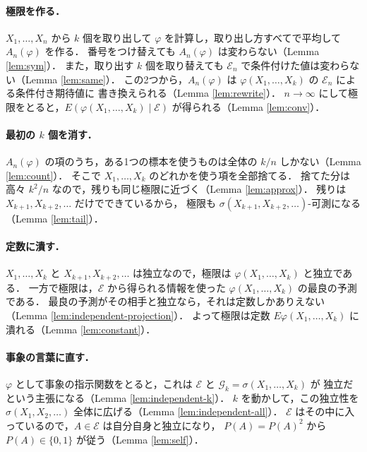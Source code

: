 \documentclass[a4paper,11pt,uplatex,dvipdfmx]{jsarticle}
\theoremstyle{plain}
\theoremstyle{definition}
\begin{document}
\paragraph{極限を作る．}
$X_1,\dots,X_n$ から $k$ 個を取り出して $\varphi$ を計算し，取り出し方すべてで平均して $A_n(\varphi)$ を作る．
番号をつけ替えても $A_n(\varphi)$ は変わらない（Lemma \ref{lem:sym}）．
また，取り出す $k$ 個を取り替えても $\mathcal{E}_n$ で条件付けた値は変わらない（Lemma \ref{lem:same}）．
この2つから，$A_n(\varphi)$ は $\varphi(X_1,\dots,X_k)$ の $\mathcal{E}_n$ による条件付き期待値に
書き換えられる（Lemma \ref{lem:rewrite}）．
$n\to\infty$ にして極限をとると，$E(\varphi(X_1,\dots,X_k)\mid\mathcal{E})$ が得られる（Lemma \ref{lem:conv}）．

\paragraph{最初の $k$ 個を消す．}
$A_n(\varphi)$ の項のうち，ある1つの標本を使うものは全体の $k/n$ しかない（Lemma \ref{lem:count}）．
そこで $X_1,\dots,X_k$ のどれかを使う項を全部捨てる．
捨てた分は高々 $k^2/n$ なので，残りも同じ極限に近づく（Lemma \ref{lem:approx}）．
残りは $X_{k+1},X_{k+2},\dots$ だけでできているから，
極限も $\sigma(X_{k+1},X_{k+2},\dots)$-可測になる（Lemma \ref{lem:tail}）．

\paragraph{定数に潰す．}
$X_1,\dots,X_k$ と $X_{k+1},X_{k+2},\dots$ は独立なので，極限は $\varphi(X_1,\dots,X_k)$ と独立である．
一方で極限は，$\mathcal{E}$ から得られる情報を使った $\varphi(X_1,\dots,X_k)$ の最良の予測である．
最良の予測がその相手と独立なら，それは定数しかありえない（Lemma \ref{lem:independent-projection}）．
よって極限は定数 $E\varphi(X_1,\dots,X_k)$ に潰れる（Lemma \ref{lem:constant}）．

\paragraph{事象の言葉に直す．}
$\varphi$ として事象の指示関数をとると，これは $\mathcal{E}$ と $\mathcal{G}_k=\sigma(X_1,\dots,X_k)$ が
独立だという主張になる（Lemma \ref{lem:independent-k}）．
$k$ を動かして，この独立性を $\sigma(X_1,X_2,\dots)$ 全体に広げる（Lemma \ref{lem:independent-all}）．
$\mathcal{E}$ はその中に入っているので，$A\in\mathcal{E}$ は自分自身と独立になり，
$P(A)=P(A)^2$ から $P(A)\in\{0,1\}$ が従う（Lemma \ref{lem:self}）．
\end{document}
